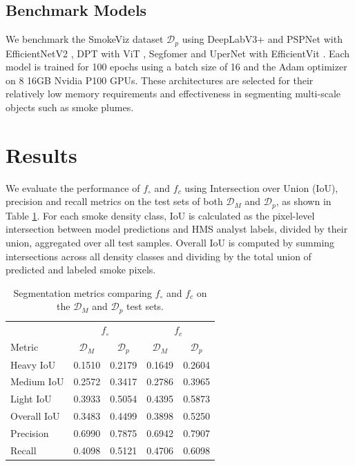 \documentclass{article}
\begin{document}
\subsection{Benchmark Models}

We benchmark the SmokeViz dataset \(\mathcal{D}_{p}\) using DeepLabV3+ \cite{deeplab} and PSPNet \cite{pspnet} with EfficientNetV2 \cite{efficientnetv2}, DPT \cite{dpt} with ViT \cite{vit}, Segfomer \cite{segformer} and UperNet \cite{upernet} with EfficientVit \cite{efficientvit}. Each model is trained for 100 epochs using a batch size of 16 and the Adam optimizer on 8 16GB Nvidia P100 GPUs. These architectures are selected for their relatively low memory requirements and effectiveness in segmenting multi-scale objects such as smoke plumes.

\section{Results}

We evaluate the performance of \(f_{\circ}\) and \(f_c\) using Intersection over Union (IoU), precision and recall metrics on the test sets of both \(\mathcal{D}_M\) and \(\mathcal{D}_p\), as shown in Table \ref{iou_results}. For each smoke density class, IoU is calculated as the pixel-level intersection between model predictions and HMS analyst labels, divided by their union, aggregated over all test samples. Overall IoU is computed by summing intersections across all density classes and dividing by the total union of predicted and labeled smoke pixels.

\begin{table}[!htb]
    \caption{Segmentation metrics comparing \( f_{\circ} \) and \( f_c \) on the \( \mathcal{D}_M \) and \( \mathcal{D}_p \) test sets.}
    \label{iou_results}
    \centering
    \begin{tabular}{lcc|cc}
        \toprule
        & \multicolumn{2}{c}{\( f_{\circ} \)} & \multicolumn{2}{c}{\( f_c \)} \\
        \cmidrule(r){2-3} \cmidrule(l){4-5}
        Metric & \( \mathcal{D}_M \) & \( \mathcal{D}_p \) & \( \mathcal{D}_M \) & \( \mathcal{D}_p \) \\
        \midrule
        Heavy IoU      & 0.1510 & 0.2179 & 0.1649 & 0.2604 \\
        Medium IoU     & 0.2572 & 0.3417 & 0.2786 & 0.3965 \\
        Light IoU      & 0.3933 & 0.5054 & 0.4395 & 0.5873 \\
        Overall IoU    & 0.3483 & 0.4499 & 0.3898 & 0.5250 \\
        \midrule
        Precision      & 0.6990 & 0.7875 & 0.6942 & 0.7907 \\
        Recall         & 0.4098 & 0.5121 & 0.4706 & 0.6098 \\
        \bottomrule
    \end{tabular}
\end{table}
\end{document}
